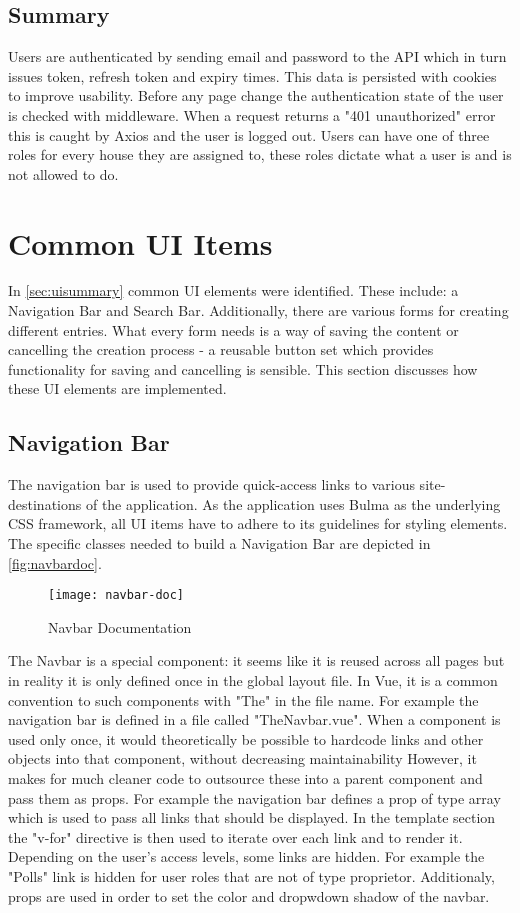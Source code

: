 \subsection{Summary}
Users are authenticated by sending email and password to the API which in turn issues token, refresh token and expiry times. This data is persisted with cookies to improve usability. Before any page change the authentication state of the user is checked with middleware. When a request returns a "401 unauthorized" error this is caught by Axios and the user is logged out. Users can have one of three roles for every house they are assigned to, these roles dictate what a user is and is not allowed to do.

\section{Common UI Items}
In \autoref{sec:uisummary} common UI elements were identified. These include: a Navigation Bar and Search Bar. Additionally, there are various forms for creating different entries. What every form needs is a way of saving the content or cancelling the creation process - a reusable button set which provides functionality for saving and cancelling is sensible. This section discusses how these UI elements are implemented.

\subsection{Navigation Bar}
The navigation bar is used to provide quick-access links to various site-destinations of the application.
As the application uses Bulma as the underlying CSS framework, all UI items have to adhere to its guidelines for styling elements. The specific classes needed to build a Navigation Bar are depicted in \autoref{fig:navbardoc}. 

\begin{figure}[H]
  \begin{center}
  \texttt{[image: navbar-doc]}
  \end{center}
  \caption{Navbar Documentation}
  \label{fig:navbardoc}
\end{figure}


The Navbar is a special component: it seems like it is reused across all pages but in reality it is only defined once in the global layout file. In Vue, it is a common convention to such components with "The" in the file name. For example the navigation bar is defined in a file called "TheNavbar.vue". When a component is used only once, it would theoretically be possible to hardcode links and other objects into that component, without decreasing maintainability However, it makes for much cleaner code to outsource these into a parent component and pass them as props. For example the navigation bar defines a prop of type array which is used to pass all links that should be displayed. In the template section the "v-for" directive is then used to iterate over each link and to render it. Depending on the user's access levels, some links are hidden. For example the "Polls" link is hidden for user roles that are not of type proprietor. Additionaly, props are used in order to set the color and dropwdown shadow of the navbar.


